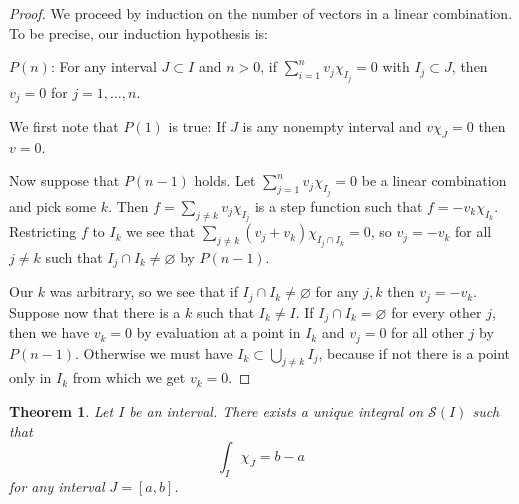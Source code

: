 \documentclass[11pt]{amsart}
\newtheorem{theo}{Theorem}
\theoremstyle{definition}
\newcommand{\cc}[1]{\mathcal{#1}}
\def\empty{\varnothing}
\begin{document}
\begin{proof}
We proceed by induction on the number of vectors in a linear combination.
To be precise, our induction hypothesis is:

$P(n)$: For any interval $J \subset I$ and $n > 0$, if $\sum_{i=1}^n v_j \chi_{I_j} = 0$ with $I_j \subset J$, then $v_j = 0$ for $j=1,\ldots,n$.

We first note that $P(1)$ is true:
If $J$ is any nonempty interval and $v \chi_{J} = 0$ then $v = 0$.

Now suppose that $P(n-1)$ holds.
Let $\sum_{j=1}^n v_j \chi_{I_j} = 0$ be a linear combination and pick some $k$.
Then $f = \sum_{j\not=k} v_j \chi_{I_j}$ is a step function such that $f = -v_k \chi_{I_k}$.
Restricting $f$ to $I_k$ we see that $\sum_{j\not=k} (v_j + v_k) \chi_{I_j \cap I_k} = 0$, so $v_j = -v_k$ for all $j\not=k$ such that $I_j \cap I_k \not= \empty$ by $P(n-1)$.

Our $k$ was arbitrary, so we see that if $I_j \cap I_k \not= \empty$ for any $j,k$ then $v_j = -v_k$.
Suppose now that there is a $k$ such that $I_k \not= I$.
If $I_j \cap I_k = \empty$ for every other $j$, then we have $v_k = 0$ by evaluation at a point in $I_k$ and $v_j = 0$ for all other $j$ by $P(n-1)$.
Otherwise we must have $I_k \subset \bigcup_{j\not=k} I_j$, because if not there is a point only in $I_k$ from which we get $v_k = 0$.
\end{proof}


\begin{theo}
Let $I$ be an interval.
There exists a unique integral on $\cc S(I)$ such that
\[
\int_I \chi_{J} = b - a
\]
for any interval $J = [a,b]$.
\end{theo}
\end{document}
